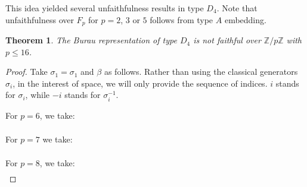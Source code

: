 \documentclass[a4paper]{amsart}
\newcommand{\Z}{\mathbb{Z}}
\newcommand{\0}{\mathbf{0}}
\theoremstyle{theorem}
\newtheorem{theorem}{Theorem}[section]
\begin{document}
This idea yielded several unfaithfulness results in type $D_4$. Note that unfaithfulness over $F_p$ for $p=2$, $3$ or $5$ follows from type $A$ embedding.
\begin{theorem}\label{thm:d4-unfaithful-finite-rings}
  The Burau representation of type $D_4$ is not faithful over $\Z/p\Z$ with $p\leq 16$.
\end{theorem}
\begin{proof}
  Take $\sigma_1=\sigma_1$ and $\beta$ as follows. Rather than using the classical generators $\sigma_i$, in the interest of space, we will only provide the sequence of indices. $i$ stands for $\sigma_i$, while $-i$ stands for $\sigma_i^{-1}$.

  For $p=6$, we take:
  \begin{align*}
    [&\scriptstyle -2, -1, 2, -4, -3, 1, -2, -1, 3, 4, -2, -1, -3, -4, 2, -3, -2, 2, -4, -2, -4, -3, 1, -2, -1, 3, 4, -1, -3, -4, -3, -4, -2, 4, 3, -2, 1, 2, -3, 
      \\&
      \scriptstyle
      -2, -1, 1, 2, -4, -2, -1, -3, -4, -2, 4, 3, 2, -4, -3, 1, -2, -1, 3, 4, -2, -3, -4, -2, 4, 3, 2, -3, -2, 2, -4, -2, -4, -3, 1, -2, -1, 3, 4]
  \end{align*}



  For $p=7$ we take:
  \begin{align*}
    [&\scriptstyle 2, -3, -4, -2, 4, 3, 2, -3, -2, 2, -4, -3, 1, -2, -1, 3, 4, -2, -1, -3, -4, -2, 2, -3, -2, 1, 2, -4, -2, -1, -1, -3, 1, -2, -1, 2, -3, -2, 2, -4,
      \\& \scriptstyle
       -2,-4, -3, 1, -2, -1, 3, 4, 2, -4, -3, 1, -2, -1, 3, 4, -2, 1, -2, -1, -1, 2, -4, -3, 1, -2, -1, 3, 4, -2, -3, 1, -2, -1, 2, -3, -2, 2, -4, -2,
      \\& \scriptstyle
       -4,-3, 1, -2, -1, 3, 4, 1, 2, -3, -2, -1, 1, 2, -4, -2, -1]
    \end{align*}

  For $p=8$, we take:
  \begin{align*}
    [& \scriptstyle -2, -1, -3, -4, -2, -1, -4, 2, -3, -2, 2, -4, -3, 1, -2, -1, 3, 4, -2, 1, -2, -1, -3, -4, -2, 4, 3, -2, 1, 2, -3, -2,-1, 1, 2, -4, -2, -1, -1,
      \\&
      \scriptstyle
      -3, -4, -2, 1, 2, -3, -2, -1, 1, 2, -4, -2, -1, -1, -3, -4, 2, -3, -2, 2, -4, -2, -4, -3, 1, -2, -1, 3, 4, -2, 1, 2, -3, -2, -1, 1, 2, -4, -2, 
            \\&
      \scriptstyle
      -1,-3, -4, -2, 4, 3, 2, -4, -3, 1, -2, -1, 3, 4, -2, -1, -3, 1, 2, -4, -2, -1]
  \end{align*}


\end{proof}
\end{document}
